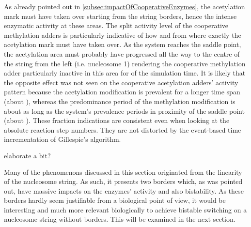             As already pointed out in \ref{subsec:impactOfCooperativeEnzymes}, the acetylation mark must have taken over starting from the string borders, hence the intense enzymatic activity at these areas. The split activity level of the cooperative methylation adders is particularly indicative of how and from where exactly the acetylation mark must have taken over. As the system reaches the saddle point, the acetylation area must probably have progressed all the way to the centre of the string from the left (i.e. nucleosome 1) rendering the cooperative methylation adder particularly inactive in this area for  of the simulation time. It is likely that the opposite effect was not seen on the cooperative acetylation adders' activity pattern because the acetylation modification is prevalent for a longer time span (about ), whereas the predominance period of the methylation modification is about as long as the system's prevalence periods in  proximity of the saddle point (about ). These fraction indications are consistent even when looking at the absolute reaction step numbers. They are not distorted by the event-based time incrementation of Gillespie's algorithm.

            \begin{itemize}
                {
                    \color{red}
                    \item elaborate a bit?
                }
            \end{itemize}

            Many of the phenomenons discussed in this section originated from the linearity of the nucleosome string. As such, it presents two borders which, as was pointed out, have massive impacts on the enzymes' activity and also bistability. As these borders hardly seem justifiable from a biological point of view, it would be interesting and much more relevant biologically to achieve bistable switching on a nucleosome string without borders. This will be examined in the next section.







